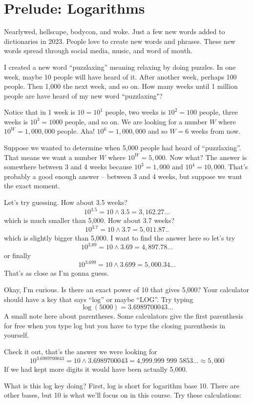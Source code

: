 \section{Prelude: Logarithms}

Nearlywed, hellscape, bodycon, and woke.  Just a few new words added to dictionaries in 2023.  People love to create new words and phrases.  These new words spread through social media, music, and word of mouth.

I created a new word ``puzzlaxing'' meaning relaxing by doing puzzles. In one week, maybe 10 people will have heard of it.  After another week, perhaps 100 people.  Then 1,000 the next week, and so on.  How many weeks until 1 million people are have heard of my new word ``puzzlaxing"?

Notice that in 1 week is $10 = 10^1$ people, two weeks is $10^2 = 100$ people, three weeks is $10^3=1000$ people, and so on.  We are looking for a number $W$ where $10^W=1,000,000$ people.  Aha!  $10^6=1,000,000$ and so $W=6$ weeks from now.

Suppose we wanted to determine when 5,000 people had heard of ``puzzlaxing''.  That means we want a number $W$ where $10^W = 5,000$.  Now what?  The answer is somewhere between 3 and 4 weeks because $10^3=1,000$ and $10^4=10,000$.  That's probably a good enough answer -- between 3 and 4 weeks, but suppose we want the exact moment. 

Let's try guessing.  How about 3.5 weeks? 
$$10^{3.5} =10 \wedge 3.5 = 3,162.27... $$ 
which is much smaller than 5,000.  How about 3.7 weeks? 
$$10^{3.7} =10 \wedge 3.7 = 5,011.87.. $$ 
which is slightly bigger than 5,000.  I want to find the answer here so let's try 
$$10^{3.69}=10 \wedge 3.69= 4,897.78...$$ 
or finally 
$$10^{3.699}=10 \wedge 3.699= 5,000.34...$$ 
That's as close as I'm gonna guess. 

Okay, I'm curious. Is there an exact power of 10 that gives 5,000?  Your calculator should have a key that says ``log'' or maybe ``LOG''.  Try typing $$\log(5000)=  3.6989700043...$$
A small note here about parentheses.  Some calculators give the first parenthesis for free when you type log but you have to type the closing parenthesis in yourself.  

Check it out, that's the answer we were looking for 
$$10^{3.6989700043} =10 \wedge 3.6989700043 = \text{4,999.999~999~5853...} \approx 5,000$$
If we had kept more digits it would have been actually 5,000.

What is this log key doing?  First, log is short for logarithm base 10.  There are other bases, but 10 is what we'll focus on in this course.  Try these calculations:

